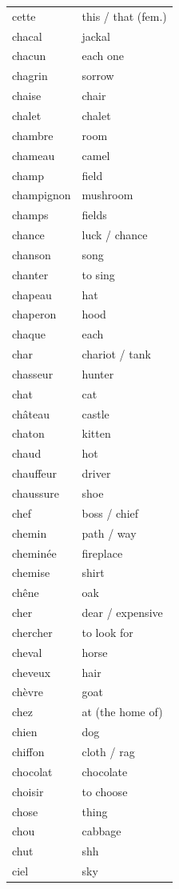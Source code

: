 \documentclass[12pt,a4paper]{article}
\begin{document}
\begin{longtable}{p{4cm} p{6cm}}
cette & this / that (fem.) \\
chacal & jackal \\
chacun & each one \\
chagrin & sorrow \\
chaise & chair \\
chalet & chalet \\
chambre & room \\
chameau & camel \\
champ & field \\
champignon & mushroom \\
champs & fields \\
chance & luck / chance \\
chanson & song \\
chanter & to sing \\
chapeau & hat \\
chaperon & hood \\
chaque & each \\
char & chariot / tank \\
chasseur & hunter \\
chat & cat \\
château & castle \\
chaton & kitten \\
chaud & hot \\
chauffeur & driver \\
chaussure & shoe \\
chef & boss / chief \\
chemin & path / way \\
cheminée & fireplace \\
chemise & shirt \\
chêne & oak \\
cher & dear / expensive \\
chercher & to look for \\
cheval & horse \\
cheveux & hair \\
chèvre & goat \\
chez & at (the home of) \\
chien & dog \\
chiffon & cloth / rag \\
chocolat & chocolate \\
choisir & to choose \\
chose & thing \\
chou & cabbage \\
chut & shh \\
ciel & sky \\

\end{longtable}
\end{document}
